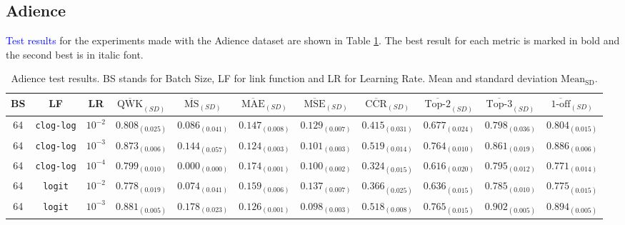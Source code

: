 \documentclass[journal]{IEEEtran}
\begin{document}
	\subsection{Adience}
	\label{sect:adience}
	\textcolor{blue}{Test results} for the experiments made with the Adience dataset are shown in Table \ref{table:AdienceTest}. The best result for each metric is marked in bold and the second best is in italic font.
	
	\begin{table}[!t]
		\caption{Adience test results. BS stands for Batch Size, LF for link function and LR for Learning Rate. Mean and standard deviation $\text{Mean}_\text{SD}$.}
		\label{table:AdienceTest}
		\footnotesize
		\centering
		\begin{tabular}{c@{\hskip 0.15cm}c@{\hskip 0.15cm}c@{\hskip 0.15cm}c@{\hskip 0.30cm}c@{\hskip 0.20cm}c@{\hskip 0.20cm}c@{\hskip 0.20cm}c@{\hskip 0.20cm}c@{\hskip 0.20cm}c@{\hskip 0.20cm}c}
			\hline
			\hline
			BS & LF & LR & $\overline{\text{QWK}}_{{(SD)}}$ & $\overline{\text{MS}}_{{(SD)}}$ & $\overline{\text{MAE}}_{{(SD)}}$ & $\overline{\text{MSE}}_{{(SD)}}$ & $\overline{\text{CCR}}_{{(SD)}}$ & $\overline{\text{Top-2}}_{{(SD)}}$ & $\overline{\text{Top-3}}_{{(SD)}}$ & $\overline{\text{1-off}}_{{(SD)}}$\\\hline
			64 & \texttt{clog-log} & $10^{-2}$ & $0.808_{(0.025)}$ & $0.086_{(0.041)}$ & $0.147_{(0.008)}$ & $0.129_{(0.007)}$ & $0.415_{(0.031)}$ & $0.677_{(0.024)}$ & $0.798_{(0.036)}$ & $0.804_{(0.015)}$\\
			64 & \texttt{clog-log} & $10^{-3}$ & $0.873_{(0.006)}$ & $0.144_{(0.057)}$ & $\mathbf{0.124_{(0.003)}}$ & $0.101_{(0.003)}$ & $\mathbf{0.519_{(0.014)}}$ & $\mathit{0.764_{(0.010)}}$ & $0.861_{(0.019)}$ & $0.886_{(0.006)}$\\
			64 & \texttt{clog-log} & $10^{-4}$ & $0.799_{(0.010)}$ & $0.000_{(0.000)}$ & $0.174_{(0.001)}$ & $0.100_{(0.002)}$ & $0.324_{(0.015)}$ & $0.616_{(0.020)}$ & $0.795_{(0.012)}$ & $0.771_{(0.014)}$\\
			64 & \texttt{logit} & $10^{-2}$ & $0.778_{(0.019)}$ & $0.074_{(0.041)}$ & $0.159_{(0.006)}$ & $0.137_{(0.007)}$ & $0.366_{(0.025)}$ & $0.636_{(0.015)}$ & $0.785_{(0.010)}$ & $0.775_{(0.015)}$\\
			64 & \texttt{logit} & $10^{-3}$ & $\mathbf{0.881_{(0.005)}}$ & $\mathit{0.178_{(0.023)}}$ & $\mathit{0.126_{(0.001)}}$ & $0.098_{(0.003)}$ & $\mathit{0.518_{(0.008)}}$ & $\mathbf{0.765_{(0.015)}}$ & $\mathbf{0.902_{(0.005)}}$ & $\mathbf{0.894_{(0.005)}}$\\

\end{tabular}
\end{table}
\end{document}
